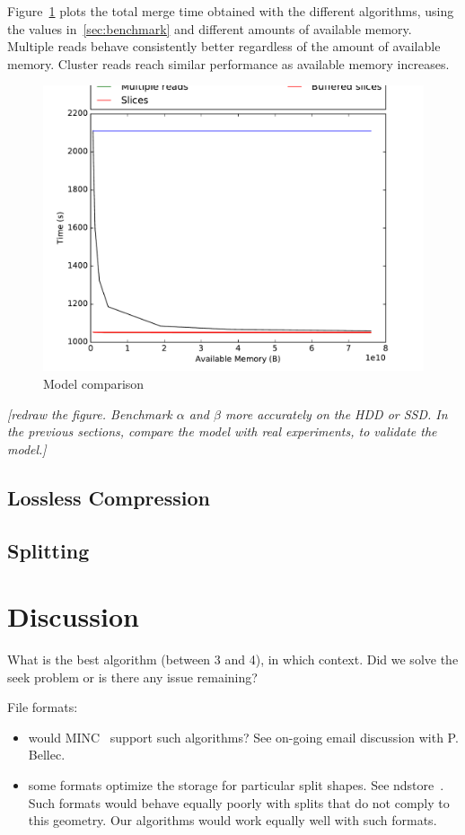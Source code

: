 \documentclass[10pt, conference, compsocconf]{IEEEtran}
\newcommand{\todo}[1]{
  \color{red}\emph{[#1]}
  \color{black}
}
\begin{document}
Figure~\ref{fig:models} plots the total merge time obtained with the
different algorithms, using the values in~\ref{sec:benchmark} and
different amounts of available memory. Multiple reads behave
consistently better regardless of the amount of available
memory. Cluster reads reach similar performance as available memory
increases.
\begin{figure}
  \includegraphics[width=\columnwidth]{figures/model.pdf}
  \caption{Model comparison}
  \label{fig:models}
\end{figure}
\todo{redraw the figure. Benchmark $\alpha$ and $\beta$ more
  accurately on the HDD or SSD. In the previous sections, compare the
  model with real experiments, to validate the model.}

\subsection{Lossless Compression}

\subsection{Splitting}


\section{Discussion}

What is the best algorithm (between 3 and 4), in which context. Did we
solve the seek problem or is there any issue remaining?

File formats:
\begin{itemize}
\item would MINC~\cite{vincent2016minc} support such algorithms? See on-going email discussion
with P. Bellec.
\item some formats optimize the storage for particular split shapes. See
  ndstore~\cite{burns2013open}. Such formats would behave equally
  poorly with splits that do not comply to this geometry. Our
  algorithms would work equally well with such formats.
\end{itemize}
\end{document}
